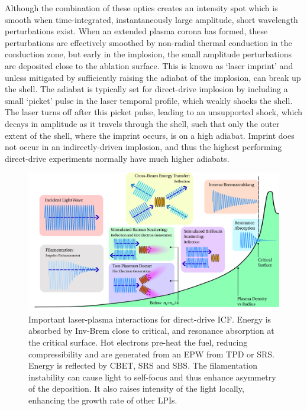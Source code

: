 Although the combination of these optics creates an intensity spot which is smooth when time-integrated, instantaneously large amplitude, short wavelength perturbations exist.
When an extended plasma corona has formed, these perturbations are effectively smoothed by non-radial thermal conduction in the conduction zone, but early in the implosion, the small amplitude perturbations are deposited close to the ablation surface.
This is known as `laser imprint' and unless mitigated by sufficiently raising the adiabat of the implosion, can break up the shell.
The adiabat is typically set for direct-drive implosion by including a small `picket' pulse in the laser temporal profile, which weakly shocks the shell.
The laser turns off after this picket pulse, leading to an unsupported shock, which decays in amplitude as it travels through the shell, such that only the outer extent of the shell, where the imprint occurs, is on a high adiabat.
Imprint does not occur in an indirectly-driven implosion, and thus the highest performing direct-drive experiments normally have much higher adiabats.

\begin{figure}[t!]
    \includegraphics[width=\linewidth]{Introduction/Images/LPI diagram.png}
    \centering
    \caption{Important laser-plasma interactions for direct-drive \ac{ICF}.
    Energy is absorbed by \ac{Inv-Brem} close to critical, and resonance absorption at the critical surface.
    Hot electrons pre-heat the fuel, reducing compressibility and are generated from an \ac{EPW} from \ac{TPD} or \ac{SRS}.
    Energy is reflected by \ac{CBET}, \ac{SRS} and \ac{SBS}.
    The filamentation instability can cause light to self-focus and thus enhance asymmetry of the deposition.
    It also raises intensity of the light locally, enhancing the growth rate of other \ac{LPIs}.
    }%
    \label{fig:intro_dd_lpis}
\end{figure}

